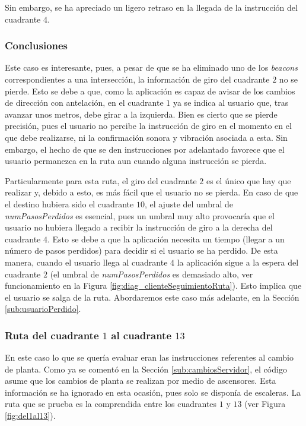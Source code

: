 Sin embargo, se ha apreciado un ligero retraso en la llegada de la instrucción del cuadrante $4$. 

 
\subsubsection*{Conclusiones}

Este caso es interesante, pues, a pesar de que se ha eliminado uno de los \textit{beacons} correspondientes a una intersección, la información de giro del cuadrante $2$ no se pierde. Esto se debe a que, como la aplicación es capaz de avisar de los cambios de dirección con antelación, en el cuadrante $1$ ya se indica al usuario que, tras avanzar unos metros, debe girar a la izquierda. Bien es cierto que se pierde precisión, pues el usuario no percibe la instrucción de giro en el momento en el que debe realizarse, ni la confirmación sonora y vibración asociada a esta. Sin embargo, el hecho de que se den instrucciones por adelantado favorece que el usuario permanezca en la ruta aun cuando alguna instrucción se pierda. 

Particularmente para esta ruta, el giro del cuadrante $2$ es el único que hay que realizar y, debido a esto, es más fácil que el usuario no se pierda. En caso de que el destino hubiera sido el cuadrante $10$, el ajuste del umbral de \textit{numPasosPerdidos} es esencial, pues un umbral muy alto provocaría que el usuario no hubiera llegado a recibir la instrucción de giro a la derecha del cuadrante $4$. Esto se debe a que la aplicación necesita un tiempo (llegar a un número de pasos perdidos) para decidir si el usuario se ha perdido. De esta manera, cuando el usuario llega al cuadrante $4$ la aplicación sigue a la espera del cuadrante $2$ (el umbral de \textit{numPasosPerdidos} es demasiado alto, ver funcionamiento en la Figura \ref{fig:diag_clienteSeguimientoRuta}). Esto implica que el usuario se salga de la ruta. Abordaremos este caso más adelante, en la Sección \ref{sub:usuarioPerdido}.


\subsubsection{Ruta del cuadrante $1$ al cuadrante $13$}
\label{subsub:del1al13}

En este caso lo que se quería evaluar eran las instrucciones referentes al cambio de planta. Como ya se comentó en la Sección \ref{sub:cambiosServidor}, el código asume que los cambios de planta se realizan por medio de ascensores. Esta información se ha ignorado en esta ocasión, pues solo se disponía de escaleras. La ruta que se prueba es la comprendida entre los cuadrantes $1$ y $13$ (ver Figura \ref{fig:del1al13}).

